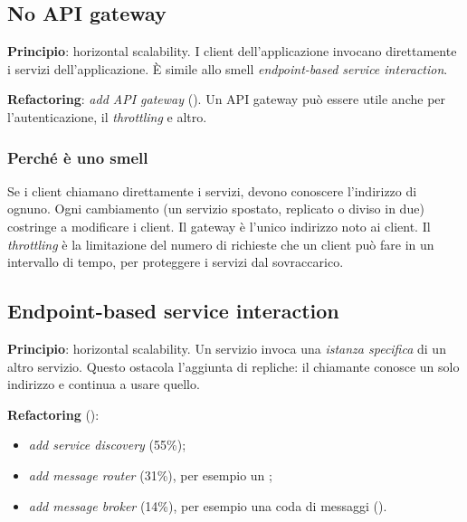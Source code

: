 \subsection{No API gateway}

\textbf{Principio}: horizontal scalability. I client dell'applicazione invocano direttamente i servizi
dell'applicazione. È simile allo smell \emph{endpoint-based service interaction}.

\textbf{Refactoring}: \emph{add API gateway} (). Un API gateway può essere utile anche per
l'autenticazione, il \emph{throttling} e altro.

\subsubsection{Perché è uno smell\aggiunta}
Se i client chiamano direttamente i servizi, devono conoscere l'indirizzo di ognuno. Ogni cambiamento (un servizio
spostato, replicato o diviso in due) costringe a modificare i client. Il gateway è l'unico indirizzo noto ai client.
Il \emph{throttling} è la limitazione del numero di richieste che un client può fare in un intervallo di tempo,
per proteggere i servizi dal sovraccarico.

\subsection{Endpoint-based service interaction}

\textbf{Principio}: horizontal scalability. Un servizio invoca una \emph{istanza specifica} di un altro servizio. Questo
ostacola l'aggiunta di repliche: il chiamante conosce un solo indirizzo e continua a usare quello.

\textbf{Refactoring} ():
\begin{itemize}
  \item \emph{add service discovery} (55\%);
  \item \emph{add message router} (31\%), per esempio un ;
  \item \emph{add message broker} (14\%), per esempio una coda di messaggi ().
\end{itemize}

